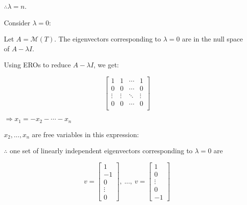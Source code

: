 \documentclass[fleqn]{article}
\begin{document}
\begin{enumerate}[nolistsep]
			$\therefore \lambda = n$.
			
			\pagebreak
			Consider $\lambda = 0$:
			
			Let $A = \mathcal{M}(T)$. The eigenvectors corresponding to $\lambda = 0$ are in the null space of $A - {\lambda}I$.
			
			Using EROs to reduce $A - {\lambda}I$, we get:
			
			\begin{equation*}
				\begin{bmatrix}
					1 & 1 & \cdots & 1\\
					0 & 0 & \cdots & 0\\
					\vdots & \vdots & \ddots & \vdots\\
					0 & 0 & \cdots & 0\\    
				\end{bmatrix}
			\end{equation*}
			
			$\Rightarrow x_1 = -x_2 - \cdots - x_n$
			
			$x_2,...,x_n$ are free variables in this expression:
			
			$\therefore$ one set of linearly independent eigenvectors corresponding to $\lambda = 0$ are
			
			\begin{equation*}
				v = \begin{bmatrix} 1 \\ -1 \\ 0 \\ \vdots \\ 0 \end{bmatrix},\ ..., \ v = \begin{bmatrix} 1 \\ 0 \\ \vdots \\ 0 \\ -1 \end{bmatrix}
			\end{equation*}
	\end{enumerate}
\end{document}
